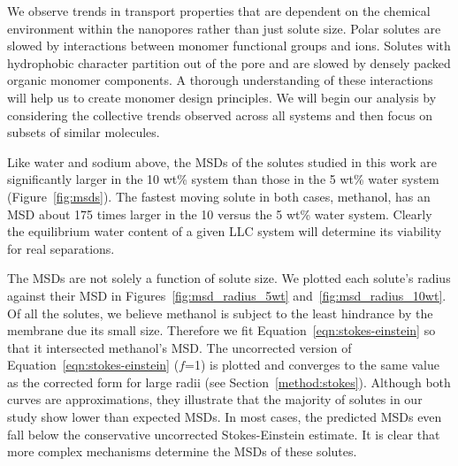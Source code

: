 \documentclass[journal=jpcbfk,manuscript=article]{achemso}
\begin{document}
  We observe trends in transport properties that are dependent on the chemical 
  environment within the nanopores rather than just solute size. Polar solutes
  are slowed by interactions between monomer functional groups and ions. Solutes
  with hydrophobic character partition out of the pore and are slowed by densely
  packed organic monomer components. A thorough understanding of these interactions
  will help us to create monomer design principles. We will begin our analysis by
  considering the collective trends observed across all systems and then focus on
  subsets of similar molecules.
  
  Like water and sodium above, the MSDs of the solutes studied in this work are 
  significantly larger in the 10 wt\% system than those in the 5 wt\% water 
  system (Figure~\ref{fig:msds}). The fastest moving solute in both cases, 
  methanol, has an MSD about 175 times larger in the 10 versus the 5 wt\%
  water system. Clearly the equilibrium water content of a given LLC system will 
  determine its viability for real separations.  %
  
  The MSDs are not solely a function of solute size. We plotted each solute's radius
  against their MSD in Figures~\ref{fig:msd_radius_5wt} and~\ref{fig:msd_radius_10wt}.
  Of all the solutes, we believe methanol is subject to the least hindrance by
  the membrane due its small size. Therefore we fit Equation~\ref{eqn:stokes-einstein}
  so that it intersected methanol's MSD. The uncorrected version of 
  Equation~\ref{eqn:stokes-einstein} ($f$=1) is plotted and converges to the same value as the
  corrected form for large radii (see Section~\ref{method:stokes}). Although both curves are 
  approximations, they illustrate that the majority of solutes in our study show
  lower than expected MSDs. In most cases, the predicted MSDs even fall below the 
  conservative uncorrected Stokes-Einstein estimate. It is clear that more complex
  mechanisms determine the MSDs of these solutes.
  
\end{document}
